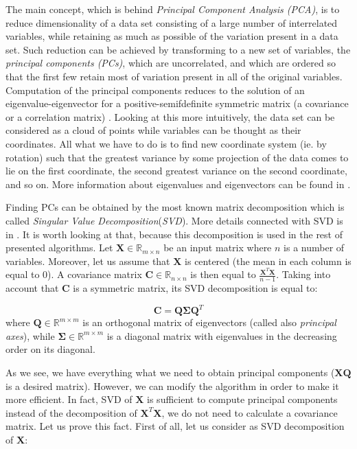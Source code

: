 \documentclass[english,a4paper,twoside]{ppfcmthesis}
\begin{document}
The main concept, which is behind \textit{Principal Component Analysis (PCA)}, is to reduce dimensionality of a data set consisting of a large number of interrelated variables, while retaining as much as possible of the variation present in a data set. Such reduction can be achieved by transforming to a new set of variables, the \textit{principal components (PCs)}, which are uncorrelated, and which are ordered so that the first few retain most of variation present in all of the original variables. Computation of the principal components reduces to the solution of an eigenvalue-eigenvector for a positive-semifdefinite symmetric matrix (a covariance or a correlation matrix) \citep{Jolliffe}. Looking at this more intuitively, the data set can be considered as a cloud of points while variables can be thought as their coordinates. All what we have to do is to find new coordinate system (ie. by rotation) such that the greatest variance by some projection of the data comes to lie on the first coordinate, the second greatest variance on the second coordinate, and so on. More information about eigenvalues and eigenvectors can be found in . 

Finding PCs can be obtained by the most known matrix decomposition which is called \textit{Singular Value Decomposition}(\textit{SVD}). More details connected with SVD is in . It is worth looking at that, because this decomposition is used in the rest of presented algorithms. Let $\boldsymbol{X} \in \mathbb{R}_{m \times n}$ be an input matrix where $n$ is a number of variables. Moreover, let us assume that $\boldsymbol{X}$ is centered (the mean in each column is equal to $0$). A covariance matrix $\boldsymbol{C} \in \mathbb{R}_{n \times n}$ is then equal to $\frac{\boldsymbol{X}^T\boldsymbol{X}}{n-1}$. Taking into account that $\boldsymbol{C}$ is a symmetric matrix, its SVD decomposition is equal to:

\begin{equation}\label{eq:pca1}
    \boldsymbol{C}=\boldsymbol{Q}\boldsymbol{\Sigma}{\boldsymbol{Q}^T}
\end{equation}
where $\boldsymbol{Q} \in \mathbb{R}^{m \times m}$ is an orthogonal matrix of eigenvectors (called also \textit{principal axes}), while $\boldsymbol{\Sigma} \in \mathbb{R}^{m \times m}$ is a diagonal matrix with eigenvalues in the decreasing order on its diagonal. 

As we see, we have everything what we need to obtain principal components ($\boldsymbol{X}\boldsymbol{Q}$ is a desired matrix). However, we can modify the algorithm in order to make it more efficient. In fact, SVD of $\boldsymbol{X}$ is sufficient to compute principal components instead of the decomposition of $\boldsymbol{X}^T\boldsymbol{X}$, we do not need to calculate a covariance matrix. Let us prove this fact. First of all, let us consider as SVD decomposition of $\boldsymbol{X}$:
\end{document}
